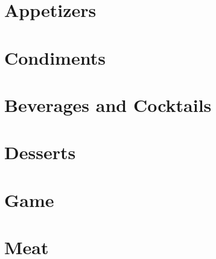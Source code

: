 \documentclass{report}
\begin{document}
    \tableofcontents

    \chapter{Appetizers}

    

    \chapter{Condiments}

    
    
    

    \chapter{Beverages and Cocktails}

    
    
    

    \chapter{Desserts}

    
    
    

    \chapter{Game}

    

    \chapter{Meat}

    
    
    
    
    
    
    
\end{document}
